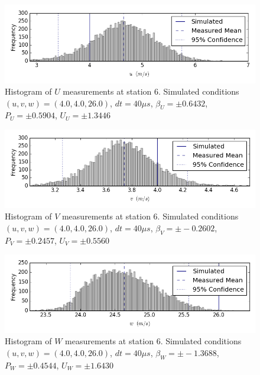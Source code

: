 \begin{figure}[H]
\centering
\includegraphics[width=6in]{figs/Ely_May28th06002/uncertainty_Ely_May28th06002_U}
\caption{Histogram of $U$ measurements at station 6. Simulated conditions $(u,v,w)=(4.0, 4.0, 26.0)$, $dt=40 \mu s$, $\beta_U=\pm 0.6432$, $P_U=\pm 0.5904$, $U_U=\pm 1.3446$}
\label{fig:uncertainty_Ely_May28th06002_U}
\end{figure}


\begin{figure}[H]
\centering
\includegraphics[width=6in]{figs/Ely_May28th06002/uncertainty_Ely_May28th06002_V}
\caption{Histogram of $V$ measurements at station 6. Simulated conditions $(u,v,w)=(4.0, 4.0, 26.0)$, $dt=40 \mu s$, $\beta_V=\pm -0.2602$, $P_V=\pm 0.2457$, $U_V=\pm 0.5560$}
\label{fig:uncertainty_Ely_May28th06002_V}
\end{figure}


\begin{figure}[H]
\centering
\includegraphics[width=6in]{figs/Ely_May28th06002/uncertainty_Ely_May28th06002_W}
\caption{Histogram of $W$ measurements at station 6. Simulated conditions $(u,v,w)=(4.0, 4.0, 26.0)$, $dt=40 \mu s$, $\beta_W=\pm -1.3688$, $P_W=\pm 0.4544$, $U_W=\pm 1.6430$}
\label{fig:uncertainty_Ely_May28th06002_W}
\end{figure}


